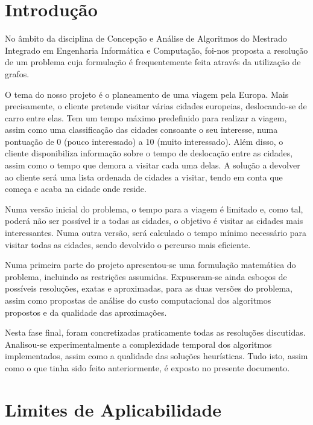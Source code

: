 \documentclass[12pt,a4paper,reqno]{report}
\numberwithin{equation}{section}
\begin{document}


\tableofcontents


\chapter{Introdução}

No âmbito da disciplina de Concepção e Análise de Algoritmos do Mestrado Integrado em Engenharia Informática e Computação, foi-nos proposta a resolução de um problema cuja formulação é frequentemente feita através da utilização de grafos.

O tema do nosso projeto é o planeamento de uma viagem pela Europa. Mais precisamente, o cliente pretende visitar várias cidades europeias, deslocando-se de carro entre elas. Tem um tempo máximo predefinido para realizar a viagem, assim como uma classificação das cidades consoante o seu interesse, numa pontuação de 0 (pouco interessado) a 10 (muito interessado). Além disso, o cliente disponibiliza informação sobre o tempo de deslocação entre as cidades, assim como o tempo que demora a visitar cada uma delas. A solução a devolver ao cliente será uma lista ordenada de cidades a visitar, tendo em conta que começa e acaba na cidade onde reside.

Numa versão inicial do problema, o tempo para a viagem é limitado e, como tal, poderá não ser possível ir a todas as cidades, o objetivo é visitar as cidades mais interessantes. Numa outra versão, será calculado o tempo mínimo necessário para visitar todas as cidades, sendo devolvido o percurso mais eficiente.

Numa primeira parte do projeto apresentou-se uma formulação matemática do problema, incluindo as restrições assumidas. Expuseram-se ainda esboços de possíveis resoluções, exatas e aproximadas, para as duas versões do problema, assim como propostas de análise do custo computacional dos algoritmos propostos e da qualidade das aproximações.

Nesta fase final, foram concretizadas praticamente todas as resoluções discutidas. Analisou-se experimentalmente a complexidade temporal dos algoritmos implementados, assim como a qualidade das soluções heurísticas. Tudo isto, assim como o que tinha sido feito anteriormente, é exposto no presente documento.

\chapter{Limites de Aplicabilidade}
\end{document}
